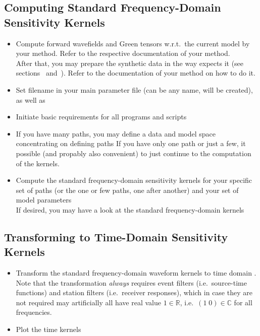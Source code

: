\subsection*{Computing Standard Frequency-Domain Sensitivity Kernels}
%
\begin{itemize}
\item Compute forward wavefields and Green tensors w.r.t.\ the current model 
by your method. Refer to the respective documentation of your method.\\
After that, you may prepare the synthetic data in the way \ASKI expects it (see sections~ 
and~). Refer to the documentation of your method on how to do it.\\
%
\item Set filename  in your main parameter file (can be any name, will be created), 
as well as  
%
\item Initiate basic requirements for all programs and scripts  
%
\item If you have many paths, you may define a data and model space concentrating on defining paths 
  If you have only one path or just a few, it possible (and propably also convenient) to just continue to the
  computation of the kernels.
%
\item Compute the standard frequency-domain sensitivity kernels for your specific set of paths (or the one or 
  few paths, one after another) and your set of model parameters  \\
  If desired, you may have a look at the standard frequency-domain kernels 
\end{itemize}
%
\subsection*{Transforming to Time-Domain Sensitivity Kernels}
%
\begin{itemize}
\item Transform the standard frequency-domain waveform kernels to time domain .
  Note that the transformation \emph{always} requires event filters (i.e.\ source-time functions) and station filters 
  (i.e.\ receiver responses), which in case they are not required may artificially all have real value $1\in\mathbb{R}$, i.e.\ 
  $(1\;0)\in\mathbb{C}$ for all frequencies.
%
\item Plot the time kernels 
\end{itemize}
%
%
\newpage
